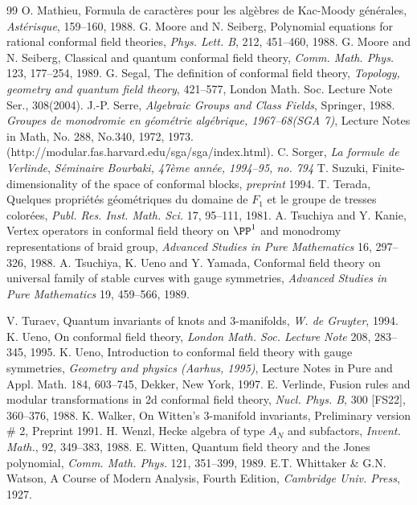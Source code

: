 \begin{thebibliography}{99}
 O. Mathieu, Formula de caract\`eres pour les alg\`ebres de Kac-Moody g\'en\'erales, \emph{Ast\'erisque}, 159--160, 1988.
 G. Moore and N. Seiberg, Polynomial equations for rational conformal field theories, \emph{Phys. Lett. B}, 212, 451--460, 1988.
 G. Moore and N. Seiberg, Classical and quantum conformal field theory, \emph{Comm. Math. Phys.} 123, 177--254, 1989.
 G. Segal, The definition of conformal field theory, \emph{Topology, geometry and quantum field theory}, 421--577, London Math. Soc. Lecture Note Ser., 308(2004).
 J.-P. Serre, \emph{Algebraic Groups and Class Fields}, Springer, 1988.
 \emph{Groupes de monodromie en g\'eom\'etrie alg\'ebrique, 1967--68(SGA 7)}, Lecture Notes in Math, No. 288, No.340, 1972, 1973. (http://modular.fas.harvard.edu/sga/sga/index.html).
 C. Sorger, \emph{La formule de Verlinde}, \emph{S\'eminaire Bourbaki, 47\`eme ann\'ee, 1994--95, no. 794}
 T. Suzuki, Finite-dimensionality of the space of conformal blocks, \emph{preprint} 1994.
 T. Terada, Quelques propri\'et\'es g\'eom\'etriques du domaine de $F_1$ et le groupe de tresses color\'ees, \emph{Publ. Res. Inst. Math. Sci.} 17, 95--111, 1981.
 A. Tsuchiya and Y. Kanie, Vertex operators in conformal field theory on $\PP^1$ and monodromy representations of braid group, \emph{Advanced Studies in Pure Mathematics} 16, 297--326, 1988.
 A. Tsuchiya, K. Ueno and Y. Yamada, Conformal field theory on universal family of stable curves with gauge symmetries, \emph{Advanced Studies in Pure Mathematics} 19, 459--566, 1989.

 V. Turaev, Quantum invariants of knots and 3-manifolds, \emph{W. de Gruyter}, 1994.
 K. Ueno, On conformal field theory, \emph{London Math. Soc. Lecture Note} 208, 283--345, 1995.
 K. Ueno, Introduction to conformal field theory with gauge symmetries, \emph{Geometry and physics (Aarhus, 1995)}, Lecture Notes in Pure and Appl. Math. 184, 603--745, Dekker, New York, 1997.
 E. Verlinde, Fusion rules and modular transformations in 2d conformal field theory, \emph{Nucl. Phys. B}, 300 [FS22], 360--376, 1988.
 K. Walker, On Witten's 3-manifold invariants, Preliminary version \# 2, Preprint 1991.
 H. Wenzl, Hecke algebra of type $A_N$ and subfactors, \emph{Invent. Math.}, 92, 349--383, 1988.
 E. Witten, Quantum field theory and the Jones polynomial, \emph{Comm. Math. Phys.} 121, 351--399, 1989.
 E.T. Whittaker \& G.N. Watson, A Course of Modern Analysis, Fourth Edition, \emph{Cambridge Univ. Press}, 1927.


\end{thebibliography}
